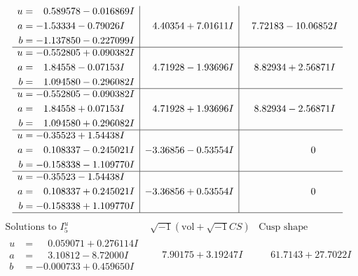 \documentclass[1p]{elsarticle_modified}
\theoremstyle{definition}
\newcommand{\I}{\sqrt{-1}}
\begin{document}
$$\begin{array}{c|c|c}
\begin{aligned}
u &= \phantom{-}0.589578 - 0.016869 I \\
a &= -1.53334 - 0.79026 I \\
b &= -1.137850 - 0.227099 I\end{aligned}
 & \phantom{-}4.40354 + 7.01611 I & \phantom{-}7.72183 - 10.06852 I \\ \hline\begin{aligned}
u &= -0.552805 + 0.090382 I \\
a &= \phantom{-}1.84558 - 0.07153 I \\
b &= \phantom{-}1.094580 - 0.296082 I\end{aligned}
 & \phantom{-}4.71928 - 1.93696 I & \phantom{-}8.82934 + 2.56871 I \\ \hline\begin{aligned}
u &= -0.552805 - 0.090382 I \\
a &= \phantom{-}1.84558 + 0.07153 I \\
b &= \phantom{-}1.094580 + 0.296082 I\end{aligned}
 & \phantom{-}4.71928 + 1.93696 I & \phantom{-}8.82934 - 2.56871 I \\ \hline\begin{aligned}
u &= -0.35523 + 1.54438 I \\
a &= \phantom{-}0.108337 - 0.245021 I \\
b &= -0.158338 - 1.109770 I\end{aligned}
 & -3.36856 - 0.53554 I & \phantom{-0.000000 } 0 \\ \hline\begin{aligned}
u &= -0.35523 - 1.54438 I \\
a &= \phantom{-}0.108337 + 0.245021 I \\
b &= -0.158338 + 1.109770 I\end{aligned}
 & -3.36856 + 0.53554 I & \phantom{-0.000000 } 0\\
 \hline 
 \end{array}$$\newpage$$\begin{array}{c|c|c}  
\text{Solutions to }I^u_{5}& \I (\text{vol} + \sqrt{-1}CS) & \text{Cusp shape}\\
 \hline 
\begin{aligned}
u &= \phantom{-}0.059071 + 0.276114 I \\
a &= \phantom{-}3.10812 - 8.72000 I \\
b &= -0.000733 + 0.459650 I\end{aligned}
 & \phantom{-}7.90175 + 3.19247 I & \phantom{-}61.7143 + 27.7022 I \\ \hline\begin{aligned}

\end{aligned}
\end{array}$$
\end{document}
